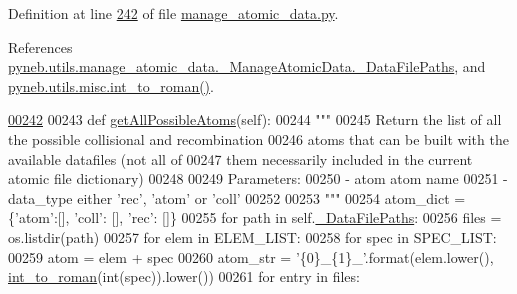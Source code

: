 Definition at line \hyperlink{manage__atomic__data_8py_source_l00242}{242} of file \hyperlink{manage__atomic__data_8py_source}{manage\-\_\-atomic\-\_\-data.\-py}.



References \hyperlink{manage__atomic__data_8py_source_l00104}{pyneb.\-utils.\-manage\-\_\-atomic\-\_\-data.\-\_\-\-Manage\-Atomic\-Data.\-\_\-\-Data\-File\-Paths}, and \hyperlink{misc_8py_source_l00055}{pyneb.\-utils.\-misc.\-int\-\_\-to\-\_\-roman()}.


\begin{DoxyCode}
\hypertarget{classpyneb_1_1utils_1_1manage__atomic__data_1_1___manage_atomic_data_l00242}{}\hyperlink{classpyneb_1_1utils_1_1manage__atomic__data_1_1___manage_atomic_data_a61c4fe67cd361ade800f01f48ea90ad0}{00242} 
00243     \textcolor{keyword}{def }\hyperlink{classpyneb_1_1utils_1_1manage__atomic__data_1_1___manage_atomic_data_a61c4fe67cd361ade800f01f48ea90ad0}{getAllPossibleAtoms}(self):
00244         \textcolor{stringliteral}{"""}
00245 \textcolor{stringliteral}{        Return the list of all the possible collisional and recombination }
00246 \textcolor{stringliteral}{        atoms that can be built with the available datafiles (not all of }
00247 \textcolor{stringliteral}{        them necessarily included in the current atomic file dictionary) }
00248 \textcolor{stringliteral}{                    }
00249 \textcolor{stringliteral}{        Parameters:}
00250 \textcolor{stringliteral}{           - atom        atom name}
00251 \textcolor{stringliteral}{           - data\_type   either 'rec', 'atom' or 'coll'}
00252 \textcolor{stringliteral}{}
00253 \textcolor{stringliteral}{        """}
00254         atom\_dict = \{\textcolor{stringliteral}{'atom'}:[], \textcolor{stringliteral}{'coll'}: [], \textcolor{stringliteral}{'rec'}: []\}
00255         \textcolor{keywordflow}{for} path \textcolor{keywordflow}{in} self.\hyperlink{classpyneb_1_1utils_1_1manage__atomic__data_1_1___manage_atomic_data_a92da10ed6b2395c54f88300c05a71ae9}{\_DataFilePaths}:
00256             files = os.listdir(path)
00257             \textcolor{keywordflow}{for} elem \textcolor{keywordflow}{in} ELEM\_LIST:
00258                 \textcolor{keywordflow}{for} spec \textcolor{keywordflow}{in} SPEC\_LIST:
00259                     atom = elem + spec
00260                     atom\_str = \textcolor{stringliteral}{'\{0\}\_\{1\}\_'}.format(elem.lower(), \hyperlink{namespacepyneb_1_1utils_1_1misc_a7a4c4b4ba1c884da72e0ea05aa8fb90b}{int\_to\_roman}(int(spec)).lower())
00261                     \textcolor{keywordflow}{for} entry \textcolor{keywordflow}{in} files:

\end{DoxyCode}
